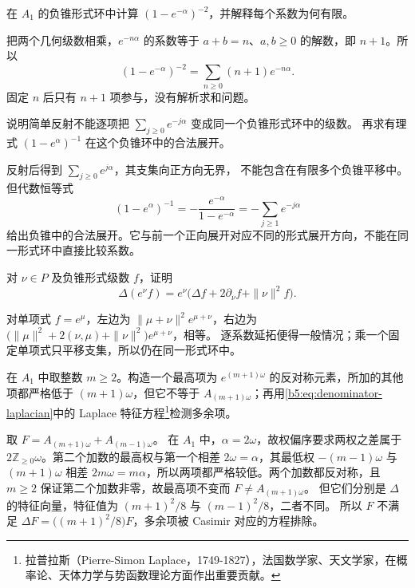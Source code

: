 \begin{exercise}\label{b5:ex:19-cone-series-product}
	在 \(A_1\) 的负锥形式环中计算 \((1-e^{-\alpha})^{-2}\)，并解释每个系数为何有限。
\end{exercise}
\begin{solution}
	把两个几何级数相乘，\(e^{-n\alpha}\) 的系数等于 \(a+b=n\)、\(a,b\ge0\) 的解数，即 \(n+1\)。所以
	\[
		(1-e^{-\alpha})^{-2}=\sum_{n\ge0}(n+1)e^{-n\alpha}.
	\]
	固定 \(n\) 后只有 \(n+1\) 项参与，没有解析求和问题。
\end{solution}

\begin{exercise}\label{b5:ex:19-reflection-completion}
	说明简单反射不能逐项把 \(\sum_{j\ge0}e^{-j\alpha}\) 变成同一个负锥形式环中的级数。 再求有理式 \((1-e^\alpha)^{-1}\) 在这个负锥环中的合法展开。
\end{exercise}
\begin{solution}
	反射后得到 \(\sum_{j\ge0}e^{j\alpha}\)，其支集向正方向无界， 不能包含在有限多个负锥平移中。 但代数恒等式
	\[
		(1-e^\alpha)^{-1} =-\frac{e^{-\alpha}}{1-e^{-\alpha}} =-\sum_{j\ge1}e^{-j\alpha}
	\]
	给出负锥中的合法展开。它与前一个正向展开对应不同的形式展开方向，不能在同一形式环中直接比较系数。
\end{solution}

\begin{exercise}\label{b5:ex:19-laplacian-shift}
	对 \(\nu\in P\) 及负锥形式级数 \(f\)，证明
	\[
		\Delta(e^\nu f) =e^\nu\bigl(\Delta f+2\partial_\nu f+\|\nu\|^2f\bigr).
	\]
\end{exercise}
\begin{solution}
	对单项式 \(f=e^\mu\)，左边为 \(\|\mu+\nu\|^2e^{\mu+\nu}\)，右边为 \(\bigl(\|\mu\|^2+2(\nu,\mu)+\|\nu\|^2\bigr)e^{\mu+\nu}\)，相等。 逐系数延拓便得一般情况；乘一个固定单项式只平移支集，所以仍在同一形式环中。
\end{solution}

\begin{exercise}\label{b5:ex:19-extra-alternants}
	在 \(A_1\) 中取整数 \(m\ge2\)。构造一个最高项为 \(e^{(m+1)\omega}\) 的反对称元素，所加的其他项都严格低于 \((m+1)\omega\)，但它不等于 \(A_{(m+1)\omega}\)；再用\eqref{b5:eq:denominator-laplacian}中的 Laplace 特征方程\footnote{拉普拉斯（Pierre-Simon Laplace，1749-1827），法国数学家、天文学家，在概率论、天体力学与势函数理论方面作出重要贡献。}检测多余项。
\end{exercise}
\begin{solution}
	取 \(F=A_{(m+1)\omega}+A_{(m-1)\omega}\)。 在 \(A_1\) 中，\(\alpha=2\omega\)，故权偏序要求两权之差属于 \(2\mathbb Z_{\ge0}\omega\)。第二个加数的最高权与第一个相差 \(2\omega=\alpha\)，其最低权 \(-(m-1)\omega\) 与 \((m+1)\omega\) 相差 \(2m\omega=m\alpha\)，所以两项都严格较低。两个加数都反对称，且 \(m\ge2\) 保证第二个加数非零，故最高项不变而 \(F\ne A_{(m+1)\omega}\)。 但它们分别是 \(\Delta\) 的特征向量，特征值为 \((m+1)^2/8\) 与 \((m-1)^2/8\)，二者不同。 所以 \(F\) 不满足 \(\Delta F=\bigl((m+1)^2/8\bigr)F\)，多余项被 Casimir 对应的方程排除。
\end{solution}

